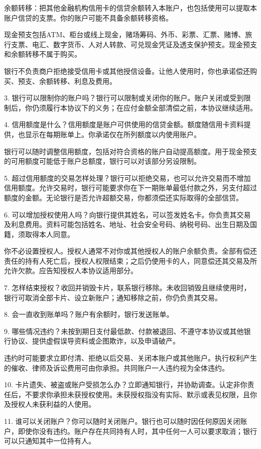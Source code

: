 \documentclass[UTF8,fontset=none,11pt,a4paper]{ctexart}
\begin{document}
余额转移：把其他金融机构信用卡的信贷余额转入本账户，也包括使用可以提取本账户信贷的支票。你的账户可能不具备余额转移资格。


现金预支包括ATM、柜台或线上现金，赌场筹码、外币、彩票、汇票、赌博、旅行支票、电汇、数字货币、人对人转款、可兑现金凭证及透支保护预支。现金预支和余额转移不属于购买。


银行不负责商户拒绝接受信用卡或其他授信设备。让他人使用时，你也承诺偿还购买、预支、余额转移、利息及费用。


3. 银行可以限制你的账户吗？银行可以限制或关闭你的账户。账户关闭或受到限制后，你仍须履行本协议下的义务；在应付金额全部清偿之前，本协议继续适用。


4. 信用额度是什么？信用额度是账户可供使用的信贷金额。额度随信用卡资料提供，也显示在每期账单上。你承诺仅在所列额度以内使用账户。


银行可以随时调整信用额度，包括对符合资格的账户自动提高额度。用于现金预支的可用额度可能低于账户总额度，银行可以对该部分另设限制。


5. 超过信用额度的交易怎样处理？银行可以拒绝交易，也可以允许交易而不增加信用额度。允许交易时，银行可能要求你在下一期账单最低付款之外，另支付超过额度的金额。无论银行是否允许超额交易，你都须偿还实际取得的全部信贷。


6. 可以增加授权使用人吗？向银行提供其姓名，可以签发姓名卡。你负责其交易及利息费用。资料可能包括姓名、地址、社会安全号码、纳税号码、出生日期及国籍，须取得本人同意。


你不必设置授权人。授权人通常不对你或其他授权人的账户余额负责。全部有偿还责任的持有人死亡后，授权人权限结束；之后仍使用卡的人，同意偿还其交易及所允许欠款。应告知授权人本协议适用部分。


7. 怎样结束授权？收回并销毁卡片，联系银行移除。未收回销毁且继续使用时，银行可取消全部卡片、设立新账户；通知移除之前，你仍负责其交易。


8. 会一直收到账单吗？账户有余额时，银行发送账单。


9. 哪些情况违约？未按到期日支付最低款、付款被退回、不遵守本协议或其他银行协议、提供虚假误导资料或企图欺诈，以及申请破产。


违约时可能要求立即付清、拒绝以后交易、关闭本账户或其他账户。执行权利产生的催收、律师及诉讼费用可由你承担。共同账户一人违约视为全体违约。


10. 卡片遗失、被盗或账户受损怎么办？立即通知银行，并协助调查。认定非你责任后，不要求你承担未获授权使用。未获授权指没有实际、默示或表见权限，且你及授权人未获利益的人使用。


11. 谁可以关闭账户？你可以随时关闭账户。银行也可以随时因任何原因关闭账户，即使你没有违约。账户存在共同持有人时，其中任何一人可以要求取消；银行可以只通知其中一位持有人。
\end{document}
